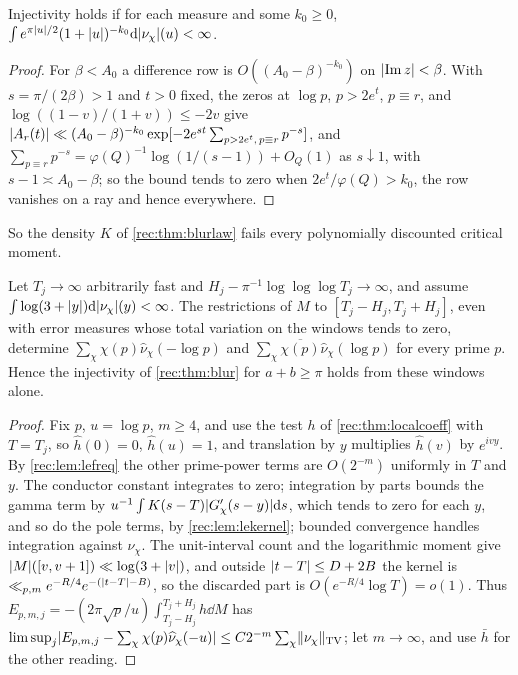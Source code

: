 \begin{corollary}\label{rec:cor:blurend}
Injectivity holds if for each measure and some $k_0\ge0$, $\int e^{\pi\lvert u\rvert/2}(1+\lvert u\rvert)^{-k_0}\mathrm{d}\lvert\nu_\chi\rvert(u)<\infty$.
\end{corollary}

\begin{proof}
For $\beta<A_0$ a difference row is $O((A_0-\beta)^{-k_0})$ on $\lvert\operatorname{Im} z\rvert<\beta$. With $s=\pi/(2\beta)>1$ and $t>0$ fixed, the zeros at
$\log p$, $p>2e^t$, $p\equiv r$, and $\log((1-v)/(1+v))\le-2v$ give
$\lvert A_r(t)\rvert\ll(A_0-\beta)^{-k_0}\exp[-2e^{st}\sum_{p>2e^t,\,p\equiv r}p^{-s}]$, and
$\sum_{p\equiv r}p^{-s}=\varphi(Q)^{-1}\log(1/(s-1))+O_Q(1)$ as $s\downarrow1$, with $s-1\asymp A_0-\beta$; so the bound tends to zero when
$2e^t/\varphi(Q)>k_0$, the row vanishes on a ray and hence everywhere.
\end{proof}

So the density $K$ of \cref{rec:thm:blurlaw} fails every polynomially discounted critical moment.

\begin{proposition}\label{rec:prop:blurwin}
Let $T_j\to\infty$ arbitrarily fast and $H_j-\pi^{-1}\log\log\log T_j\to\infty$, and assume
$\int\log(3+\lvert y\rvert)\mathrm{d}\lvert\nu_\chi\rvert(y)<\infty$. The restrictions of $M$ to $[T_j-H_j,T_j+H_j]$, even with error measures whose total
variation on the windows tends to zero, determine $\sum_\chi\chi(p)\widehat\nu_\chi(-\log p)$ and $\sum_\chi\overline{\chi(p)}\widehat\nu_\chi(\log p)$ for
every prime $p$. Hence the injectivity of \cref{rec:thm:blur} for $a+b\ge\pi$ holds from these windows alone.
\end{proposition}

\begin{proof}
Fix $p$, $u=\log p$, $m\ge4$, and use the test $h$ of \cref{rec:thm:localcoeff} with $T=T_j$, so $\widehat h(0)=0$, $\widehat h(u)=1$, and
translation by $y$ multiplies $\widehat h(v)$ by $e^{ivy}$. By \cref{rec:lem:lefreq} the other prime-power terms are $O(2^{-m})$
uniformly in $T$ and $y$. The conductor constant integrates to zero; integration by parts bounds the gamma term
by $u^{-1}\int K(s-T)\lvert G'_\chi(s-y)\rvert\mathrm{d} s$, which tends to zero for each $y$, and so do the pole terms, by
\cref{rec:lem:lekernel}; bounded convergence handles integration against $\nu_\chi$. The unit-interval count and the
logarithmic moment give $\lvert M\rvert([v,v+1])\ll\log(3+\lvert v\rvert)$, and outside $\lvert t-T\rvert\le D+2B$ the kernel is
$\ll_{p,m}e^{-R/4}e^{-(\lvert t-T\rvert-B)}$, so the discarded part is $O(e^{-R/4}\log T)=o(1)$. Thus
$E_{p,m,j}=-(2\pi\sqrt p/u)\int_{T_j-H_j}^{T_j+H_j}h\dd M$ has
$\limsup_j\lvert E_{p,m,j}-\sum_\chi\chi(p)\widehat\nu_\chi(-u)\rvert\le C2^{-m}\sum_\chi\lVert\nu_\chi\rVert_{\mathrm{TV}}$; let $m\to\infty$, and use $\bar h$ for the other
reading.
\end{proof}

